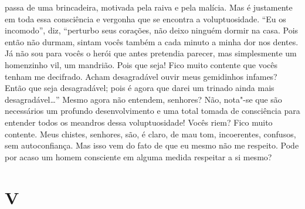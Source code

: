 passa de uma brincadeira, motivada pela raiva e pela malícia. Mas é
justamente em toda essa consciência e vergonha que se encontra a
voluptuosidade. “Eu os incomodo”, diz, “perturbo seus corações, não
deixo ninguém dormir na casa. Pois então não durmam, sintam vocês
também a cada minuto a minha dor nos dentes. Já não sou para vocês o
herói que antes pretendia parecer, mas simplesmente um homenzinho vil,
um mandrião. Pois que seja! Fico muito contente que vocês tenham me
decifrado. Acham desagradável ouvir meus gemidinhos infames? Então que
seja desagradável; pois é agora que darei um trinado ainda mais
desagradável\ldots{}” Mesmo agora não entendem, senhores? Não, nota"-se que
são necessários um profundo desenvolvimento e uma total tomada de
consciência para entender todos os meandros dessa voluptuosidade! Vocês
riem? Fico muito contente. Meus chistes, senhores, são, é claro, de mau
tom, incoerentes, confusos, sem autoconfiança. Mas isso vem do fato de
que eu mesmo não me respeito. Pode por acaso um homem consciente em
alguma medida respeitar a si mesmo?


\section{V}

